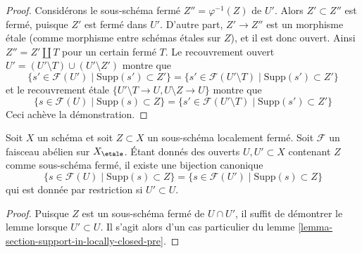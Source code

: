 \begin{proof}
Considérons le sous-schéma fermé $Z'' = \varphi^{-1}(Z)$ de $U'$.
Alors $Z' \subset Z''$ est fermé, puisque $Z'$ est fermé dans $U'$.
D'autre part, $Z' \to Z''$ est un morphisme étale
(comme morphisme entre schémas étales sur $Z$), et il est donc
ouvert. Ainsi $Z'' = Z' \amalg T$ pour un certain fermé $T$.
Le recouvrement ouvert $U' = (U' \setminus T) \cup (U' \setminus Z')$
montre que
$$
\{s' \in \mathcal{F}(U') \mid \text{Supp}(s') \subset Z'\} =
\{s' \in \mathcal{F}(U' \setminus T) \mid \text{Supp}(s') \subset Z'\}
$$
et le recouvrement étale $\{U' \setminus T \to U, U \setminus Z \to U\}$
montre que
$$
\{s \in \mathcal{F}(U) \mid \text{Supp}(s) \subset Z\} =
\{s' \in \mathcal{F}(U' \setminus T) \mid \text{Supp}(s') \subset Z'\}
$$
Ceci achève la démonstration.
\end{proof}

\begin{lemma}
\label{lemma-section-support-in-locally-closed}
Soit $X$ un schéma et soit $Z \subset X$ un sous-schéma localement fermé.
Soit $\mathcal{F}$ un faisceau abélien sur $X_\etale$. Étant donnés des ouverts
$U, U' \subset X$ contenant $Z$ comme sous-schéma fermé,
il existe une bijection canonique
$$
\{s \in \mathcal{F}(U) \mid \text{Supp}(s) \subset Z\} =
\{s \in \mathcal{F}(U') \mid \text{Supp}(s) \subset Z\}
$$
qui est donnée par restriction si $U' \subset U$.
\end{lemma}

\begin{proof}
Puisque $Z$ est un sous-schéma fermé de $U \cap U'$, il suffit de
démontrer le lemme lorsque $U' \subset U$. Il s'agit alors d'un cas particulier
du lemme \ref{lemma-section-support-in-locally-closed-pre}.
\end{proof}

